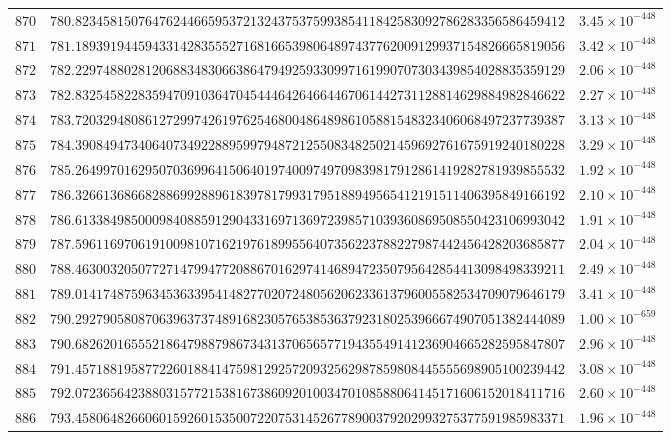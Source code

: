 \documentclass[12pt,reqno]{amsart}
\theoremstyle{remark}
\begin{document}
\begin{longtable}{clc}
$870$ & $780.8234581507647624466595372132437537599385411842583092786283356586459412$ & $3.45\times 10^{-448}$ \\
$871$ & $781.1893919445943314283555271681665398064897437762009129937154826665819056$ & $3.42\times 10^{-448}$ \\
$872$ & $782.2297488028120688348306638647949259330997161990707303439854028835359129$ & $2.06\times 10^{-448}$ \\
$873$ & $782.8325458228359470910364704544464264664467061442731128814629884982846622$ & $2.27\times 10^{-448}$ \\
$874$ & $783.7203294808612729974261976254680048648986105881548323406068497237739387$ & $3.13\times 10^{-448}$ \\
$875$ & $784.3908494734064073492288959979487212550834825021459692761675919240180228$ & $3.29\times 10^{-448}$ \\
$876$ & $785.2649970162950703699641506401974009749709839817912861419282781939855532$ & $1.92\times 10^{-448}$ \\
$877$ & $786.3266136866828869928896183978179931795188949565412191511406395849166192$ & $2.10\times 10^{-448}$ \\
$878$ & $786.6133849850009840885912904331697136972398571039360869508550423106993042$ & $1.91\times 10^{-448}$ \\
$879$ & $787.5961169706191009810716219761899556407356223788227987442456428203685877$ & $2.04\times 10^{-448}$ \\
$880$ & $788.4630032050772714799477208867016297414689472350795642854413098498339211$ & $2.49\times 10^{-448}$ \\
$881$ & $789.0141748759634536339541482770207248056206233613796005582534709079646179$ & $3.41\times 10^{-448}$ \\
$882$ & $790.2927905808706396373748916823057653853637923180253966674907051382444089$ & $1.00\times 10^{-659}$ \\
$883$ & $790.6826201655521864798879867343137065657719435549141236904665282595847807$ & $2.96\times 10^{-448}$ \\
$884$ & $791.4571881958772260188414759812925720932562987859808445555698905100239442$ & $3.08\times 10^{-448}$ \\
$885$ & $792.0723656423880315772153816738609201003470108588064145171606152018411716$ & $2.60\times 10^{-448}$ \\
$886$ & $793.4580648266060159260153500722075314526778900379202993275377591985983371$ & $1.96\times 10^{-448}$ \\

\end{longtable}
\end{document}
